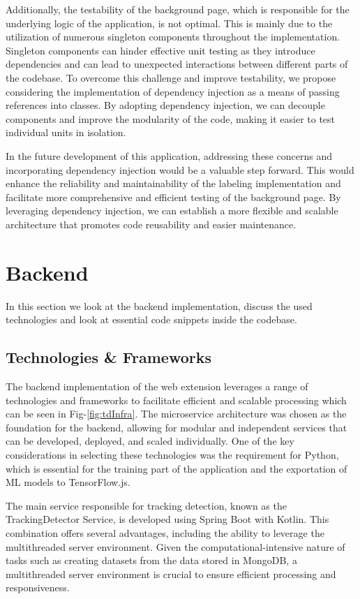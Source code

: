 Additionally, the testability of the background page, which is responsible for the underlying logic of the application,
is not optimal. This is mainly due to the utilization of numerous singleton components throughout the implementation.
Singleton components can hinder effective unit testing as they introduce dependencies and can lead to unexpected interactions
between different parts of the codebase. To overcome this challenge and improve testability, we propose considering the
implementation of dependency injection as a means of passing references into classes. By adopting dependency injection, we
can decouple components and improve the modularity of the code, making it easier to test individual units in isolation.

In the future development of this application, addressing these concerns and incorporating dependency injection would
be a valuable step forward. This would enhance the reliability and maintainability of the labeling implementation
and facilitate more comprehensive and efficient testing of the background page. By leveraging dependency injection,
we can establish a more flexible and scalable architecture that promotes code reusability and easier maintenance.

\section{Backend}
In this section we look at the backend implementation, discuss the used technologies and look at essential code
snippets inside the codebase.
\subsection{Technologies \& Frameworks}
The backend implementation of the web extension leverages a range of technologies and frameworks to facilitate efficient and scalable
processing which can be seen in Fig-\ref{fig:tdInfra}. The microservice architecture was chosen as the foundation for the backend, allowing for modular and independent services
that can be developed, deployed, and scaled individually. One of the key considerations in selecting these technologies was the
requirement for Python, which is essential for the training part of the application and the exportation of ML models
to TensorFlow.js.

The main service responsible for tracking detection, known as the TrackingDetector Service, is developed using Spring Boot
with Kotlin. This combination offers several advantages, including the ability to leverage the multithreaded server environment.
Given the computational-intensive nature of tasks such as creating datasets from the data stored in MongoDB, a multithreaded
server environment is crucial to ensure efficient processing and responsiveness.

